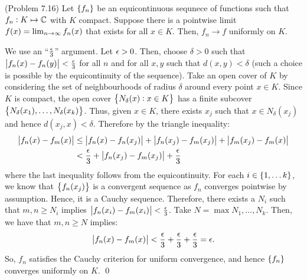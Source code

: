 \begin{ntheorem}{ (Problem 7.16)}{}
    Let $\set{f_n}$ be an equicontinuous sequnece of functions such that $f_n: K \mapsto \mathbb{C}$ with $K$ compact. Suppose there is a pointwise limit $f(x) = \lim_{n \rightarrow \infty} f_n(x)$ that exists for all $x \in K$. Then, $f_n \rightarrow f$ uniformly on $K$.
\end{ntheorem}
\begin{nproof}
    We use an ``$\frac{\epsilon}{3}$'' argument. Let $\epsilon > 0$. Then, choose $\delta > 0$ such that $\abs{f_n(x) - f_n(y)} < \frac{\epsilon}{3}$ for all $n$ and for all $x, y$ such that $d(x, y) < \delta$ (such a choice is possible by the equicontinuity of the sequence). Take an open cover of $K$ by considering the set of neighbourhoods of radius $\delta$ around every point $x \in K$. Since $K$ is compact, the open cover $\set{N_{\delta}(x): x \in K}$ has a finite subcover $\set{N_\delta(x_1), \ldots, N_\delta(x_k)}$. Thus, given $x \in K$, there exists $x_j$ such that $x \in N_\delta(x_j)$ and hence $d(x_j, x) < \delta$. Therefore by the triangle inequality:
    \begin{align*}
        \abs{f_n(x) - f_m(x)} &\leq \abs{f_n(x) - f_n(x_j)} + \abs{f_n(x_j) - f_m(x_j)} + \abs{f_m(x_j) - f_m(x)}
        \\ &< \frac{\epsilon}{3} + \abs{f_n(x_j) - f_m(x_j)} + \frac{\epsilon}{3}
    \end{align*}
    where the last inequality follows from the equicontinuity. For each $i \in \set{1, \ldots k}$, we know that $\set{f_n(x_j)}$ is a convergent sequence as $f_n$ converges pointwise by assumption. Hence, it is a Cauchy sequence. Therefore, there exists a $N_i$ such that $m, n \geq N_i$ implies $\abs{f_n(x_i) - f_m(x_i)} < \frac{\epsilon}{3}$. Take $N = \max{N_1, \ldots, N_k}$. Then, we have that $m, n \geq N$ implies:
    \begin{align*}
        \abs{f_n(x) - f_m(x)} < \frac{\epsilon}{3} + \frac{\epsilon}{3} + \frac{\epsilon}{3} = \epsilon.
    \end{align*}
    So, $f_n$ satisfies the Cauchy criterion for uniform convergence, and hence $\set{f_n}$ converges uniformly on $K$. \qed
\end{nproof}

\setcounter{rudin}{23}

